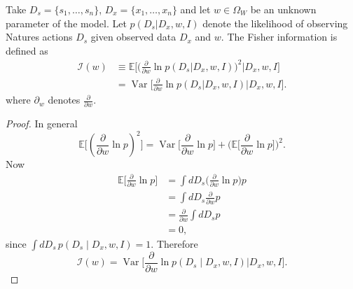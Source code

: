 \begin{definition}
	\label{def:fisher_information}
	Take $D_s = \{s_1, \dots, s_n\}$, $D_x = \{x_1, \dots, x_n\}$ and let $w \in \Omega_W$ be an unknown parameter of the model. Let $p(D_s | D_x, w, I)$ denote the likelihood of observing Natures actions $D_s$ given observed data $D_x$ and $w$. The Fisher information is defined as
	\begin{equation}
		\begin{split}
			\mathcal{I}(w) &\equiv \mathbb{E} \bigg[\bigg(\frac{\partial}{\partial w} \ln p(D_s|D_x, w,I)\bigg)^2 \Bigg| D_x, w,I\bigg]\\
			&= \operatorname{Var}\bigg[\frac{\partial}{\partial w} \ln p(D_s|D_x, w,I) \Bigg| D_x, w,I\bigg].
		\end{split}
	\end{equation}
	where $\partial_w$ denotes $\frac{\partial}{\partial w}$.
\end{definition}

\begin{proof}
	In general
	\begin{equation}
		\mathbb{E}\bigg[(\frac{\partial}{\partial w} \ln p)^2\bigg] 
		= \operatorname{Var}\bigg[\frac{\partial}{\partial w} \ln p\bigg] + 
		\bigg(\mathbb{E}\bigg[\frac{\partial}{\partial w} \ln p\bigg]\bigg)^2.
	\end{equation}
	Now
	\begin{align}
		\mathbb{E}\bigg[\frac{\partial}{\partial w} \ln p\bigg] 
		&= \int dD_s  \bigg(\frac{\partial}{\partial w} \ln p\bigg)  p \\
		&= \int dD_s  \frac{\partial}{\partial w} p \\
		&= \frac{\partial}{\partial w} \int dD_s  p \\
		&= 0,
	\end{align}
	since $\int dD_s \, p(D_s \mid D_x, w, I) = 1$. Therefore
	\begin{equation}
		\mathcal{I}(w) = \operatorname{Var}\bigg[\frac{\partial}{\partial w} \ln p(D_s \mid D_x, w, I) \bigg| D_x, w, I\bigg].
	\end{equation}
\end{proof}

